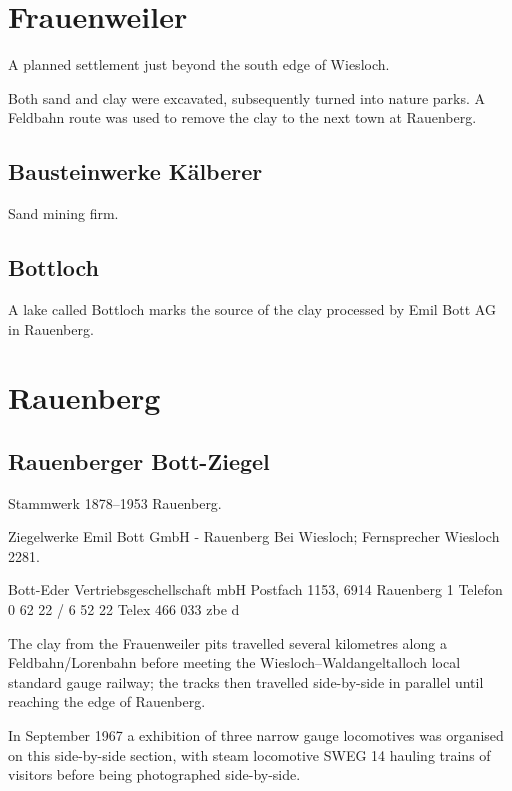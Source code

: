 \documentclass[a4paper]{report}
\begin{document}
\section{Frauenweiler}

A planned settlement just beyond the south edge of Wiesloch.

Both sand and clay were excavated, subsequently turned into nature
parks.\cite{Hildebrandt-75-2012} A Feldbahn route was used to remove
the clay to the next town at Rauenberg.\cite{Rothenhoefer-bott-2016}

\subsection{Bausteinwerke Kälberer}

Sand mining firm.

\subsection{Bottloch}

A lake called Bottloch marks the source of the clay processed by Emil
Bott AG in Rauenberg.\cite{Rothenhoefer-bott-2016}

\section{Rauenberg}

\subsection{Rauenberger Bott-Ziegel}

Stammwerk 1878--1953 Rauenberg.

Ziegelwerke Emil Bott GmbH - Rauenberg Bei Wiesloch;
Fernsprecher Wiesloch 2281.

Bott-Eder Vertriebsgeschellschaft mbH
Postfach 1153, 6914 Rauenberg 1
Telefon 0 62 22 / 6 52 22
Telex 466 033 zbe d

The clay from the Frauenweiler pits travelled several kilometres along
a Feldbahn/Lorenbahn before meeting the Wiesloch--Waldangeltalloch
local standard gauge railway; the tracks then travelled side-by-side
in parallel until reaching the edge of
Rauenberg.\cite{Rothenhoefer-bott-2016}

In September 1967 a exhibition of three narrow gauge locomotives was
organised on this side-by-side section, with steam locomotive SWEG 14
hauling trains of visitors before being photographed side-by-side.\cite{Freundkreis-8}
\end{document}
